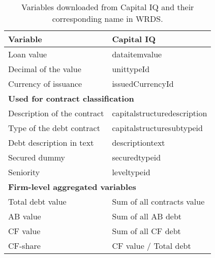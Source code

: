 \documentclass[12pt]{article}
\begin{document}
\begin{table}[htbp]    

    \centering
    \begin{tabular}{ll}
    \toprule
    Variable & Capital IQ \\
    \midrule
    Loan value & dataitemvalue \\
    Decimal of the value & unittypeId \\
    Currency of issuance & issuedCurrencyId \vspace{3mm} \\
    \multicolumn{2}{l}{\textbf{Used for contract classification}} \\
    Description of the contract & capitalstructuredescription \\
    Type of the debt contract & capitalstructuresubtypeid \\
    Debt description in text & descriptiontext \\
    Secured dummy & securedtypeid \\
    Seniority & leveltypeid \vspace{3mm} \\
    \multicolumn{2}{l}{\textbf{Firm-level aggregated variables}} \\
    Total debt value & Sum of all contracts value \\
    AB value & Sum of all AB debt \\
    CF value & Sum of all CF debt \\
    CF-share & CF value / Total debt \\
    \bottomrule
    \end{tabular}
    \caption{\small Variables downloaded from Capital IQ and their corresponding name in WRDS.}
    \label{tab:CAPIQ}

\end{table}
\end{document}
